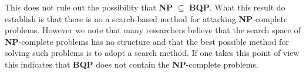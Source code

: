 This does not rule out the possibility that \textbf{NP} $\subseteq$ \textbf{BQP}. What this result do establish is that there is no a search-based method for attacking \textbf{NP}-complete problems.
However we note that many researchers believe that the search space of \textbf{NP}-complete problems has no structure and that the best possible method for solving such problems is to adopt a search method. If one takes this point of view this indicates that \textbf{BQP} does not contain the \textbf{NP}-complete problems.